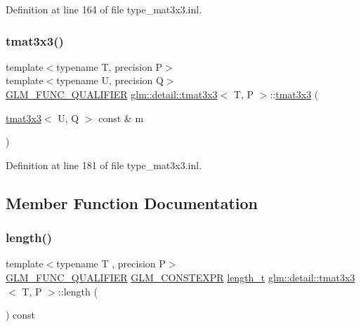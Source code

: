 Definition at line 164 of file type\+\_\+mat3x3.\+inl.

\mbox{\label{structglm_1_1detail_1_1tmat3x3_a5a59337ed9a816f87aa1c16300c670f8}} 
\subsubsection{\texorpdfstring{tmat3x3()}{tmat3x3()}\hspace{0.1cm}{\footnotesize\ttfamily [22/22]}}
{\footnotesize\ttfamily template$<$typename T, precision P$>$ \\
template$<$typename U, precision Q$>$ \\
\hyperlink{setup_8hpp_a33fdea6f91c5f834105f7415e2a64407}{G\+L\+M\+\_\+\+F\+U\+N\+C\+\_\+\+Q\+U\+A\+L\+I\+F\+I\+ER} \hyperlink{structglm_1_1detail_1_1tmat3x3}{glm\+::detail\+::tmat3x3}$<$ T, P $>$\+::\hyperlink{structglm_1_1detail_1_1tmat3x3}{tmat3x3} (\begin{DoxyParamCaption}\item[{\hyperlink{structglm_1_1detail_1_1tmat3x3}{tmat3x3}$<$ U, Q $>$ const \&}]{m }\end{DoxyParamCaption})}



Definition at line 181 of file type\+\_\+mat3x3.\+inl.



\subsection{Member Function Documentation}
\mbox{\label{structglm_1_1detail_1_1tmat3x3_a0b4c489fc4d36a368659d7e2d07fd88e}} 
\subsubsection{\texorpdfstring{length()}{length()}}
{\footnotesize\ttfamily template$<$typename T , precision P$>$ \\
\hyperlink{setup_8hpp_a33fdea6f91c5f834105f7415e2a64407}{G\+L\+M\+\_\+\+F\+U\+N\+C\+\_\+\+Q\+U\+A\+L\+I\+F\+I\+ER} \hyperlink{setup_8hpp_a08b807947b47031d3a511f03f89645ad}{G\+L\+M\+\_\+\+C\+O\+N\+S\+T\+E\+X\+PR} \hyperlink{namespaceglm_a090a0de2260835bee80e71a702492ed9}{length\+\_\+t} \hyperlink{structglm_1_1detail_1_1tmat3x3}{glm\+::detail\+::tmat3x3}$<$ T, P $>$\+::length (\begin{DoxyParamCaption}{ }\end{DoxyParamCaption}) const}



